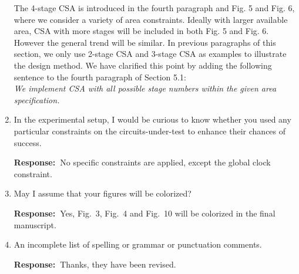 \documentclass[a4paper, 11pt]{article}
\def\Response{\noindent \textbf{Response:~}}
\newcommand{\Question}[1]{\textcolor[rgb]{0.51,0.00,0.00}{#1}}
\newcommand{\PaperText}[1]{\emph{#1}}
\begin{document}
\begin{enumerate}
      The 4-stage CSA is introduced in the fourth paragraph and Fig. 5 and Fig. 6, where we consider a variety of area constraints. Ideally with larger available area, CSA with more stages will be included in both Fig. 5 and Fig. 6. However the general trend will be similar. In previous paragraphs of this section, we only use 2-stage CSA and 3-stage CSA as examples to illustrate the design method. We have clarified this point by adding the following sentence to the fourth paragraph of Section 5.1:\\
      
      \PaperText{We implement CSA with all possible stage numbers within the given area specification.}\\
      
  \item \Question{In the experimental setup, I would be curious to know whether you used any particular constraints on the circuits-under-test to enhance their chances of success.}
      
      \Response  No specific constraints are applied, except the global clock constraint.
      
  \item \Question{May I assume that your figures will be colorized?}
        
      \Response Yes, Fig.~3, Fig.~4 and Fig.~10 will be colorized in the final manuscript.
      
  \item \Question{An incomplete list of spelling or grammar or punctuation comments.}
      
      \Response Thanks, they have been revised.

      

\end{enumerate}
\end{document}
